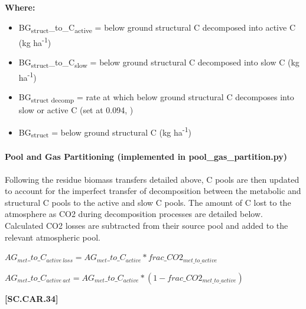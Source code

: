         \textbf{Where:}
            
        \begin{itemize}
            \item BG\textsubscript{struct}\_to\_C\textsubscript{active} = below ground structural C decomposed into active C (kg ha\textsuperscript{-1})
            \item BG\textsubscript{struct}\_to\_C\textsubscript{slow} = below ground structural C decomposed into slow C (kg ha\textsuperscript{-1})
            \item BG\textsubscript{struct decomp} = rate at which below ground structural C decomposes into slow or active C (set at 0.094, \cite{parton1987analysis})
            \item BG\textsubscript{struct} = below ground structural C (kg ha\textsuperscript{-1})
        \end{itemize}
        \vspace{0.5cm}

\paragraph{Pool and Gas Partitioning (implemented in pool\_gas\_partition.py)}
\vspace{0.2cm}

Following the residue biomass transfers detailed above, C pools are then updated to account for the imperfect transfer of decomposition between the metabolic and structural C pools to the active and slow C pools. The amount of C lost to the atmosphere as CO2 during decomposition processes are detailed below. Calculated CO2 losses are subtracted from their source pool and added to the relevant atmospheric pool.
        \vspace{0.5cm}

    \begin{center}
\(AG_{met}\_to\_C_{active\ loss}=AG_{met}\_to\_C_{active} * frac\_CO2_{met\_to\_active}\)
\vspace{0.1cm}

\(AG_{met}\_to\_C_{active\ act}=AG_{met}\_to\_C_{active} * (1-frac\_ CO2_{met\_to\_active})\)

    \end{center}
        \vspace{0.5cm} 
    
            {\raggedleft \textbf{[SC.CAR.34]}\par}
            \vspace{0.5cm}

